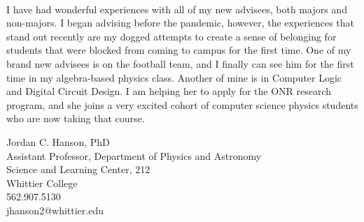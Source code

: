 \documentclass[../main.tex]{subfiles}
\begin{document}
\\
\vspace{0.15cm}
I have had wonderful experiences with all of my new advisees, both majors and non-majors.  I began advising before the pandemic, however, the experiences that stand out recently are my dogged attempts to create a sense of belonging for students that were blocked from coming to campus for the first time.  One of my brand new advisees is on the football team, and I finally can see him for the first time in my algebra-based physics class.  Another of mine is in Computer Logic and Digital Circuit Design.  I am helping her to apply for the ONR research program, and she joins a very excited cohort of computer science physics students who are now taking that course.

Jordan C. Hanson, PhD \\
Assistant Professor, Department of Physics and Astronomy \\
Science and Learning Center, 212 \\
Whittier College \\
562.907.5130 \\
jhanson2@whittier.edu
\end{document}
